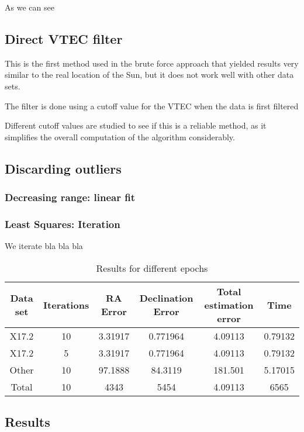 As we can see

\subsection{Direct VTEC filter}

This is the first method used in the brute force approach that yielded results very similar to the real location of the Sun, but it does not work well with other data sets.

The filter is done using a cutoff value for the VTEC when the data is first filtered

Different cutoff values are studied to see if this is a reliable method, as it simplifies the overall computation of the algorithm considerably.

\subsection{Discarding outliers}

\subsubsection{Decreasing range: linear fit}

\subsubsection{Least Squares: Iteration}

We iterate bla bla bla

\begin{table}[h!]
	\centering
	\def\arraystretch{1.2}
	\begin{tabular}{|c c c c c c|} 
		\hline
		Data set & Iterations & RA Error & Declination Error & Total estimation error & Time \\ [0.5ex] 
		\hline\hline
		X17.2 & 10 & 3.31917 & 0.771964 & 4.09113 & 0.79132 \\
		\hline
		X17.2 & 5 & 3.31917 & 0.771964 & 4.09113 & 0.79132 \\
		\hline
		Other & 10 & 97.1888 & 84.3119 & 181.501 & 5.17015 \\
		\hline\hline
		Total & 10 & 4343 & 5454 & 4.09113 & 6565 \\
		\hline
	\end{tabular}
	\caption{Results for different epochs}
\end{table}

\subsection{Results}

